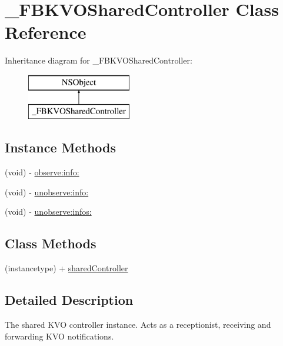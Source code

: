 \hypertarget{interface___f_b_k_v_o_shared_controller}{\section{\+\_\+\+F\+B\+K\+V\+O\+Shared\+Controller Class Reference}
\label{interface___f_b_k_v_o_shared_controller}
}
Inheritance diagram for \+\_\+\+F\+B\+K\+V\+O\+Shared\+Controller\+:\begin{figure}[H]
\begin{center}
\leavevmode
\includegraphics[height=2.000000cm]{interface___f_b_k_v_o_shared_controller}
\end{center}
\end{figure}
\subsection*{Instance Methods}
\begin{DoxyCompactItemize}
\item 
(void) -\/ \hyperlink{interface___f_b_k_v_o_shared_controller_a3c86b19c63b309078c372d3ba9c82423}{observe\+:info\+:}
\item 
(void) -\/ \hyperlink{interface___f_b_k_v_o_shared_controller_a8c1ecb634733652d00e1d0171eea4856}{unobserve\+:info\+:}
\item 
(void) -\/ \hyperlink{interface___f_b_k_v_o_shared_controller_a672c0e721f004e5f34ea8e497d9f4841}{unobserve\+:infos\+:}
\end{DoxyCompactItemize}
\subsection*{Class Methods}
\begin{DoxyCompactItemize}
\item 
(instancetype) + \hyperlink{interface___f_b_k_v_o_shared_controller_afc8dc49222e1a694297251398e1a5341}{shared\+Controller}
\end{DoxyCompactItemize}


\subsection{Detailed Description}
The shared K\+V\+O controller instance.  Acts as a receptionist, receiving and forwarding K\+V\+O notifications. 

